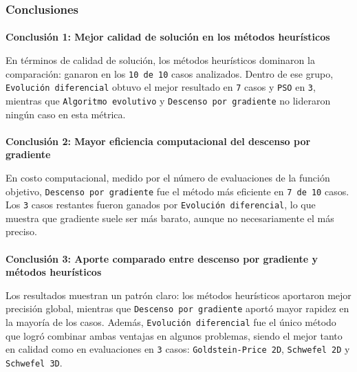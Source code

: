 \documentclass[
  12pt,
  letterpaper,
  DIV=11,
  numbers=noendperiod]{scrartcl}
\makeatletter
\let\oldparagraph\paragraph
\renewcommand{\paragraph}{
    \@ifstar
      \xxxParagraphStar
      \xxxParagraphNoStar
  }
\newcommand{\xxxParagraphStar}[1]{\oldparagraph*{#1}\mbox{}}
\newcommand{\xxxParagraphNoStar}[1]{\oldparagraph{#1}\mbox{}}
\makeatother
\begin{document}
\subsubsection{Conclusiones}\label{conclusiones}

\paragraph{\texorpdfstring{\textbf{Conclusión 1: Mejor calidad de
solución en los métodos
heurísticos}}{Conclusión 1: Mejor calidad de solución en los métodos heurísticos}}\label{conclusiuxf3n-1-mejor-calidad-de-soluciuxf3n-en-los-muxe9todos-heuruxedsticos}

En términos de calidad de solución, los métodos heurísticos dominaron la
comparación: ganaron en los \texttt{10\ de\ 10} casos analizados. Dentro
de ese grupo, \texttt{Evolución\ diferencial} obtuvo el mejor resultado
en \texttt{7} casos y \texttt{PSO} en \texttt{3}, mientras que
\texttt{Algoritmo\ evolutivo} y \texttt{Descenso\ por\ gradiente} no
lideraron ningún caso en esta métrica.

\paragraph{\texorpdfstring{\textbf{Conclusión 2: Mayor eficiencia
computacional del descenso por
gradiente}}{Conclusión 2: Mayor eficiencia computacional del descenso por gradiente}}\label{conclusiuxf3n-2-mayor-eficiencia-computacional-del-descenso-por-gradiente}

En costo computacional, medido por el número de evaluaciones de la
función objetivo, \texttt{Descenso\ por\ gradiente} fue el método más
eficiente en \texttt{7\ de\ 10} casos. Los \texttt{3} casos restantes
fueron ganados por \texttt{Evolución\ diferencial}, lo que muestra que
gradiente suele ser más barato, aunque no necesariamente el más preciso.

\paragraph{\texorpdfstring{\textbf{Conclusión 3: Aporte comparado entre
descenso por gradiente y métodos
heurísticos}}{Conclusión 3: Aporte comparado entre descenso por gradiente y métodos heurísticos}}\label{conclusiuxf3n-3-aporte-comparado-entre-descenso-por-gradiente-y-muxe9todos-heuruxedsticos}

Los resultados muestran un patrón claro: los métodos heurísticos
aportaron mejor precisión global, mientras que
\texttt{Descenso\ por\ gradiente} aportó mayor rapidez en la mayoría de
los casos. Además, \texttt{Evolución\ diferencial} fue el único método
que logró combinar ambas ventajas en algunos problemas, siendo el mejor
tanto en calidad como en evaluaciones en \texttt{3} casos:
\texttt{Goldstein-Price\ 2D}, \texttt{Schwefel\ 2D} y
\texttt{Schwefel\ 3D}.
\end{document}
